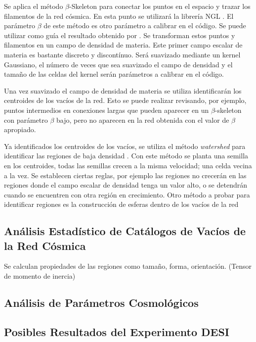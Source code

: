 \documentclass[preprint]{aastex62}
\begin{document}
  Se aplica el método $\beta$-Skeleton para conectar los puntos en el espacio y trazar los
  filamentos de la red cósmica. En esta punto se utilizará la librería NGL \citep{ngl}.
  El parámetro $\beta$ de este método es otro parámetro a calibrar en el código. Se puede
  utilizar como guía el resultado obtenido por \citet{Fang2018}.
  Se transforman estos puntos y filamentos en un campo de densidad de materia. Este primer
  campo escalar de materia es bastante discreto y discontínuo. Será suavizado mediante un
  kernel Gaussiano, el número de veces que sea suavizado el campo de densidad y el tamaño de
  las celdas del kernel serán parámetros a calibrar en el código.

  Una vez suavizado el campo de densidad de materia se utiliza identificarán los centroides
  de los vacíos de la red. Esto se puede realizar revisando, por ejemplo, puntos intermedios
  en conexiones largas  que pueden aparecer en un $\beta$-skeleton con parámetro $\beta$ bajo,
  pero no aparecen en la red obtenida con el valor de $\beta$ apropiado.

  Ya identificados los centroides de los vacíos, se utiliza el método \textit{watershed}
  para identificar las regiones de baja densidad \citep{Sutter2015}. Con este método
  se planta una semilla en los centroides, todas las semillas crecen a la misma velocidad; una
  celda vecina a la vez. Se establecen ciertas reglas, por ejemplo las regiones no crecerán en
  las regiones donde el campo escalar de densidad tenga un valor alto, o se detendrán cuando
  se encuentren con otra región en crecimiento.
  Otro método a probar para identificar regiones es la construcción de esferas dentro de los
  vacíos de la red 

  \subsection{Análisis Estadístico de Catálogos de Vacíos de la Red Cósmica}

  Se calculan propiedades de las regiones como tamaño, forma, orientación. (Tensor de momento de inercia) \citep{El-Ad1997}

  \subsection{Análisis de Parámetros Cosmológicos}

  \subsection{Posibles Resultados del Experimento DESI}
  
\end{document}

